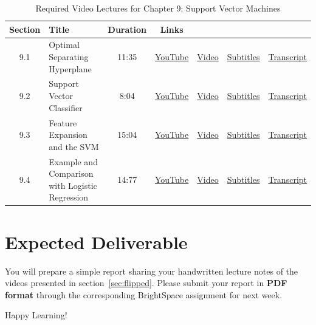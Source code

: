 \documentclass{article}
\begin{document}
\begin{table}
  \centering
  \caption{Required Video Lectures for Chapter 9: Support Vector Machines}
  \label{tab:videos}
  \begin{tabular}{c l c c c c c}
    \toprule
      Section & Title & Duration & Links & & & \\
    \midrule
      9.1 & Optimal Separating Hyperplane & 11:35 &
      \href{https://youtu.be/Op0OyOuDjcQ?si=AIDVK3V8UJm1ZF6d}{YouTube} &
      \href{https://drive.google.com/drive/folders/18XPpCin0sGCLQ1QS0QHu1_YRrw-_XSi_?usp=sharing}{Video} &
      \href{https://drive.google.com/drive/folders/18XPpCin0sGCLQ1QS0QHu1_YRrw-_XSi_?usp=sharing}{Subtitles} &
      \href{https://drive.google.com/drive/folders/18XPpCin0sGCLQ1QS0QHu1_YRrw-_XSi_?usp=sharing}{Transcript} \\
      9.2 & Support Vector Classifier & 8:04 &
      \href{https://youtu.be/pjvnCEfAswc?si=tIAVWqSq9LJINIB4}{YouTube} &
      \href{https://drive.google.com/drive/folders/18XPpCin0sGCLQ1QS0QHu1_YRrw-_XSi_?usp=sharing}{Video} &
      \href{https://drive.google.com/drive/folders/18XPpCin0sGCLQ1QS0QHu1_YRrw-_XSi_?usp=sharing}{Subtitles} &
      \href{https://drive.google.com/drive/folders/18XPpCin0sGCLQ1QS0QHu1_YRrw-_XSi_?usp=sharing}{Transcript} \\
      9.3 & Feature Expansion and the SVM & 15:04 &
      \href{https://youtu.be/02icdqOJsH4?si=NXI1yGPRjaCeJlh_}{YouTube} &
      \href{https://drive.google.com/drive/folders/18XPpCin0sGCLQ1QS0QHu1_YRrw-_XSi_?usp=sharing}{Video} &
      \href{https://drive.google.com/drive/folders/18XPpCin0sGCLQ1QS0QHu1_YRrw-_XSi_?usp=sharing}{Subtitles} &
      \href{https://drive.google.com/drive/folders/18XPpCin0sGCLQ1QS0QHu1_YRrw-_XSi_?usp=sharing}{Transcript} \\
      9.4 & Example and Comparison with Logistic Regression & 14:77 &
      \href{https://youtu.be/48P-oV6cH44?si=OMwV3cCBfeSiSZl7}{YouTube} &
      \href{https://drive.google.com/drive/folders/18XPpCin0sGCLQ1QS0QHu1_YRrw-_XSi_?usp=sharing}{Video} &
      \href{https://drive.google.com/drive/folders/18XPpCin0sGCLQ1QS0QHu1_YRrw-_XSi_?usp=sharing}{Subtitles} &
      \href{https://drive.google.com/drive/folders/18XPpCin0sGCLQ1QS0QHu1_YRrw-_XSi_?usp=sharing}{Transcript} \\
    \bottomrule
  \end{tabular}
\end{table}

\section{Expected Deliverable}
\label{sec:deliverables}

You will prepare a simple report sharing your handwritten lecture notes of the videos presented in section~\ref{sec:flipped}.  Please submit your report in \textbf{PDF format} through the corresponding BrightSpace\texttrademark{} assignment for next week.

\vspace{5mm}
Happy Learning! 
\end{document}
